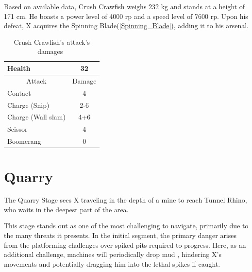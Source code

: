 Based on available data, Crush Crawfish weighs 232 kg and stands at a height of 171 cm. He boasts a power level of 4000 rp and a speed level of 7600 rp. Upon his defeat, X acquires the Spinning Blade(\ref{Spinning_Blade}), adding it to his arsenal.

\begin{table}[htp]
	\centering
	\begin{tabular}[h]{l c}
		\toprule
		Health  & 32\\
		\midrule
		\multicolumn{1}{c}{Attack} & \multicolumn{1}{c}{Damage}\\
		Contact & 4\\
		Charge (Snip)& 2-6\\
		Charge (Wall slam)& 4+6\\
		Scissor& 4\\
		Boomerang & 0\\
		\bottomrule
	\end{tabular}
	\caption{Crush Crawfish's attack's damages~\cite{wiki:Crush_crawfish,book:Compendium}}
\end{table} 

\section{Quarry}
The Quarry Stage sees X traveling in the depth of a mine to reach Tunnel Rhino, who waits in the deepest part of the area.

This stage stands out as one of the most challenging to navigate, primarily due to the many threats it presents. In the initial segment, the primary danger arises from the platforming challenges over spiked pits required to progress. Here, as an additional challenge, machines will periodically drop mud , hindering X's movements and potentially dragging him into the lethal spikes if caught.

